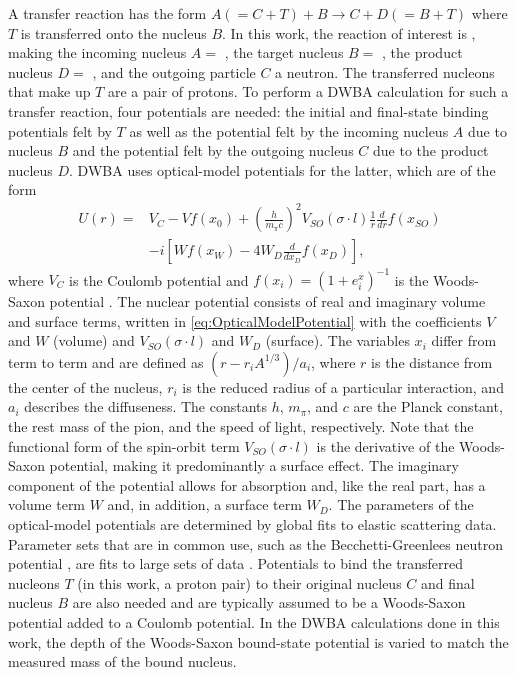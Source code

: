 A transfer reaction has the form $A (= C+T)+B\rightarrow C+D( = B+T)$ where $T$ is transferred onto the nucleus $B$.  In this work, the reaction of interest is , making the incoming nucleus $A=$ , the target nucleus $B=$ , the product nucleus $D=$ , and the outgoing particle $C$ a neutron.  The transferred nucleons that make up $T$ are a pair of protons.  To perform a DWBA calculation for such a transfer reaction, four potentials are needed: the initial and final-state binding potentials felt by $T$ as well as the potential felt by the incoming nucleus $A$ due to nucleus $B$ and the potential felt by the outgoing nucleus $C$ due to the product nucleus $D$.  DWBA uses optical-model potentials for the latter, which are of the form
\begin{equation}
\label{eq:OpticalModelPotential}
\begin{split}
U(r) = & V_C - Vf(x_0) + \left( \frac{h}{m_{\pi}c} \right) ^2 V_{SO}(\sigma\cdot l)\frac{1}{r}\frac{d}{dr}f(x_{SO}) \\
 & -i[Wf(x_W) - 4W_D\frac{d}{dx_D}f(x_D)],
\end{split}
\end{equation}
where $V_C$ is the Coulomb potential and $f(x_i)=(1+e^x_i)^{-1}$ is the Woods-Saxon potential \citep{PereyPerey}.  The nuclear potential consists of real and imaginary volume and surface terms, written in \ref{eq:OpticalModelPotential} with the coefficients $V$ and $W$ (volume) and $V_{SO}(\sigma\cdot l)$ and $W_D$ (surface).  The variables $x_i$ differ from term to term and are defined as $(r-r_iA^{1/3})/a_i$, where $r$ is the distance from the center of the nucleus, $r_i$ is the reduced radius of a particular interaction, and $a_i$ describes the diffuseness.  The constants $h$, $m_{\pi}$, and $c$ are the Planck constant, the rest mass of the pion, and the speed of light, respectively.  Note that the functional form of the spin-orbit term $V_{SO}(\sigma\cdot l)$ is the derivative of the Woods-Saxon potential, making it predominantly a surface effect.  The imaginary component of the potential allows for absorption and, like the real part, has a volume term $W$ and, in addition, a surface term $W_D$.  The parameters of the optical-model potentials are determined by global fits to elastic scattering data.  Parameter sets that are in common use, such as the Becchetti-Greenlees neutron potential \citep{Becchetti_neutronPotential}, are fits to large sets of data \citep{PereyPerey}.  Potentials to bind the transferred nucleons $T$ (in this work, a proton pair) to their original nucleus $C$ and final nucleus $B$ are also needed and are typically assumed to be a Woods-Saxon potential added to a Coulomb potential.  In the DWBA calculations done in this work, the depth of the Woods-Saxon bound-state potential is varied to match the measured mass of the bound nucleus.
 
